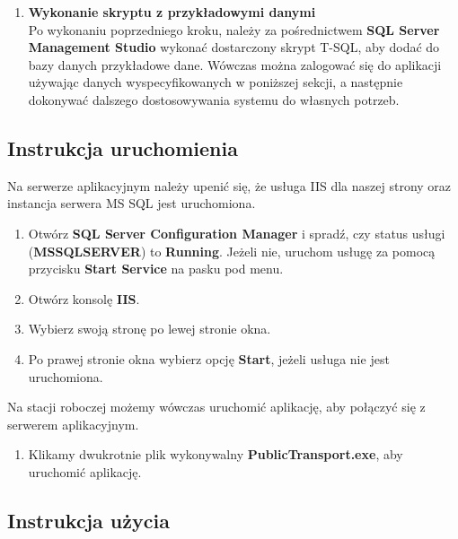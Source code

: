 \documentclass[10pt,a4paper]{article}
\begin{document}
\begin{enumerate}
	\item \textbf{Wykonanie skryptu z przykładowymi danymi} \\
	Po wykonaniu poprzedniego kroku, należy za pośrednictwem \textbf{SQL Server Management Studio} wykonać dostarczony skrypt T-SQL, aby dodać do bazy danych przykładowe dane. Wówczas można zalogować się do aplikacji używając danych wyspecyfikowanych w poniższej sekcji, a następnie dokonywać dalszego dostosowywania systemu do własnych potrzeb.
\end{enumerate}

\subsection{Instrukcja uruchomienia}
Na serwerze aplikacyjnym należy upenić się, że usługa IIS dla naszej strony oraz instancja serwera MS SQL jest uruchomiona. 
\begin{enumerate}
	\item Otwórz \textbf{SQL Server Configuration Manager} i spradź, czy status usługi (\textbf{MSSQLSERVER}) to \textbf{Running}. Jeżeli nie, uruchom usługę za pomocą przycisku \textbf{Start Service} na pasku pod menu.
	\item Otwórz konsolę \textbf{IIS}.
	\item Wybierz swoją stronę po lewej stronie okna.
	\item Po prawej stronie okna wybierz opcję \textbf{Start}, jeżeli usługa nie jest uruchomiona.
\end{enumerate}
Na stacji roboczej możemy wówczas uruchomić aplikację, aby połączyć się z serwerem aplikacyjnym.
\begin{enumerate}
	\item Klikamy dwukrotnie plik wykonywalny \textbf{PublicTransport.exe}, aby uruchomić aplikację.
\end{enumerate}

\subsection{Instrukcja użycia}
\end{document}
